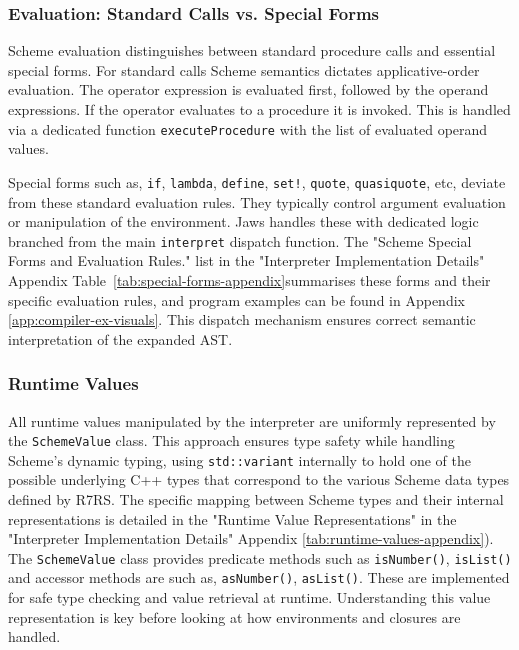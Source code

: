 \documentclass[final]{cmpreport_02}
\begin{document}
\subsubsection{Evaluation: Standard Calls vs. Special Forms}

Scheme evaluation distinguishes between standard procedure calls and essential special forms. For standard calls Scheme semantics dictates applicative-order evaluation. The operator expression is evaluated first, followed by the operand expressions. If the operator evaluates to a procedure it is invoked. This is handled via a dedicated function \texttt{executeProcedure} with the list of evaluated operand values.

Special forms such as, \texttt{if}, \texttt{lambda}, \texttt{define}, \texttt{set!}, \texttt{quote}, \texttt{quasiquote}, etc, deviate from these standard evaluation rules. They typically control argument evaluation or manipulation of the environment. Jaws handles these with dedicated logic branched from the main \texttt{interpret} dispatch function. The "Scheme Special Forms and Evaluation Rules." list in the "Interpreter Implementation Details" Appendix Table~\ref{tab:special-forms-appendix}summarises these forms and their specific evaluation rules, and program examples can be found in Appendix \ref{app:compiler-ex-visuals}. This dispatch mechanism ensures correct semantic interpretation of the expanded AST.

\subsubsection{Runtime Values}

All runtime values manipulated by the interpreter are uniformly represented by the \texttt{SchemeValue} class. This approach ensures type safety while handling Scheme's dynamic typing, using \texttt{std::variant} internally to hold one of the possible underlying C++ types that correspond to the various Scheme data types defined by R7RS. The specific mapping between Scheme types and their internal representations is detailed in the "Runtime Value Representations" in the "Interpreter Implementation Details" Appendix \ref{tab:runtime-values-appendix}). The \texttt{SchemeValue} class provides predicate methods such as \texttt{isNumber()}, \texttt{isList()} and accessor methods are such as, \texttt{asNumber()}, \linebreak\texttt{asList()}. These are implemented for safe type checking and value retrieval at runtime. Understanding this value representation is key before looking at how environments and closures are handled.
\end{document}
